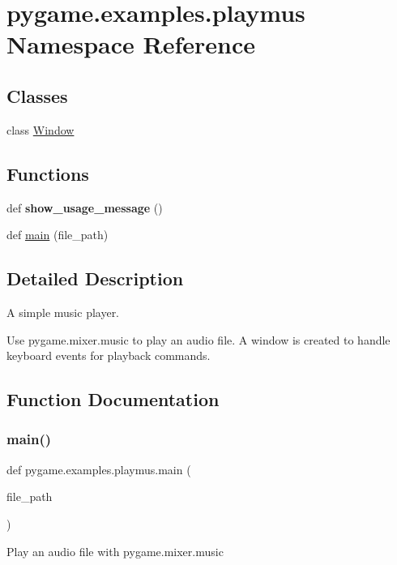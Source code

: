 \hypertarget{namespacepygame_1_1examples_1_1playmus}{}\section{pygame.\+examples.\+playmus Namespace Reference}
\label{namespacepygame_1_1examples_1_1playmus}
\subsection*{Classes}
\begin{DoxyCompactItemize}
\item 
class \hyperlink{classpygame_1_1examples_1_1playmus_1_1_window}{Window}
\end{DoxyCompactItemize}
\subsection*{Functions}
\begin{DoxyCompactItemize}
\item 
\mbox{\label{namespacepygame_1_1examples_1_1playmus_ac3a511788c35f535951f6532a63a477d}} 
def {\bfseries show\+\_\+usage\+\_\+message} ()
\item 
def \hyperlink{namespacepygame_1_1examples_1_1playmus_a3670174424318f585a7966e688c80fb0}{main} (file\+\_\+path)
\end{DoxyCompactItemize}


\subsection{Detailed Description}
\begin{DoxyVerb}A simple music player.

   Use pygame.mixer.music to play an audio file. A window is
   created to handle keyboard events for playback commands.\end{DoxyVerb}
 

\subsection{Function Documentation}
\mbox{\label{namespacepygame_1_1examples_1_1playmus_a3670174424318f585a7966e688c80fb0}} 
\subsubsection{\texorpdfstring{main()}{main()}}
{\footnotesize\ttfamily def pygame.\+examples.\+playmus.\+main (\begin{DoxyParamCaption}\item[{}]{file\+\_\+path }\end{DoxyParamCaption})}

\begin{DoxyVerb}Play an audio file with pygame.mixer.music\end{DoxyVerb}
 